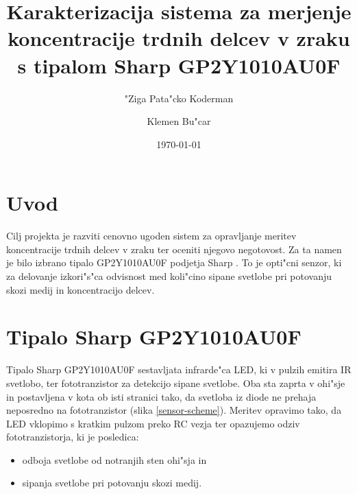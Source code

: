\documentclass[11pt,a4paper]{article}
\begin{document}
\title{Karakterizacija sistema za merjenje koncentracije trdnih delcev v zraku s tipalom Sharp GP2Y1010AU0F}
\author{"Ziga Pata"cko Koderman \and Klemen Bu"car}
\date{\today}

\clearpage\maketitle
\thispagestyle{empty}
\pagebreak

\tableofcontents
\pagebreak

\section{Uvod}

Cilj projekta je razviti cenovno ugoden sistem za opravljanje meritev koncentracije trdnih delcev v zraku ter oceniti njegovo negotovost. Za ta namen je bilo izbrano tipalo GP2Y1010AU0F podjetja Sharp \cite{sharp-gp2y1010au0f}. To je opti"cni senzor, ki za delovanje izkori"s"ca odvisnost med koli"cino sipane svetlobe pri potovanju skozi medij in koncentracijo delcev.


\pagebreak

\section{Tipalo Sharp GP2Y1010AU0F}

Tipalo Sharp GP2Y1010AU0F \cite{sharp-gp2y1010au0f} sestavljata infrarde"ca LED, ki v pulzih emitira IR svetlobo, ter fototranzistor za detekcijo sipane svetlobe. Oba sta zaprta v ohi"sje in postavljena v kota ob isti stranici tako, da svetloba iz diode ne prehaja neposredno na fototranzistor (slika \ref{sensor-scheme}). Meritev opravimo tako, da LED vklopimo s kratkim pulzom preko RC vezja ter opazujemo odziv fototranzistorja, ki je posledica:
\begin{itemize}
	\item odboja svetlobe od notranjih sten ohi"sja in
	\item sipanja svetlobe pri potovanju skozi medij.
\end{itemize}
\end{document}
